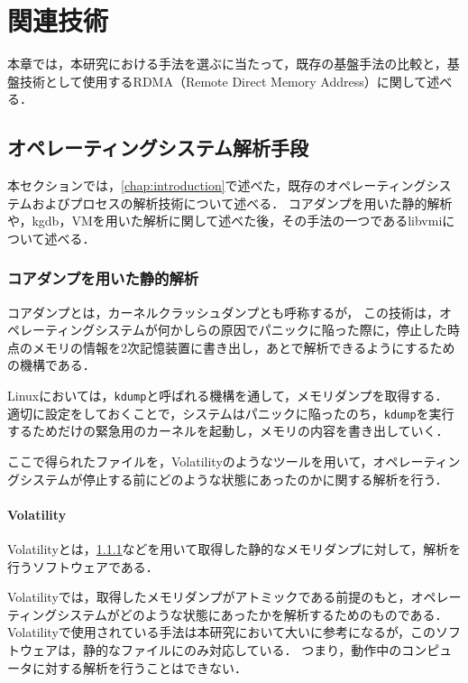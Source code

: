 \chapter{関連技術}
\label{chap:related_works}

本章では，本研究における手法を選ぶに当たって，既存の基盤手法の比較と，基盤技術として使用するRDMA（Remote Direct Memory Address）に関して述べる．

\section{オペレーティングシステム解析手段}

本セクションでは，\ref{chap:introduction}で述べた，既存のオペレーティングシステムおよびプロセスの解析技術について述べる．
コアダンプを用いた静的解析や，kgdb，VMを用いた解析に関して述べた後，その手法の一つであるlibvmiについて述べる．

\subsection{コアダンプを用いた静的解析}
\label{subsubsection:core_dump}

コアダンプとは，カーネルクラッシュダンプとも呼称する\cite{dump}が，
この技術は，オペレーティングシステムが何かしらの原因でパニックに陥った際に，停止した時点のメモリの情報を2次記憶装置に書き出し，あとで解析できるようにするための機構である．

Linuxにおいては，\verb|kdump|と呼ばれる機構を通して，メモリダンプを取得する．
適切に設定をしておくことで，システムはパニックに陥ったのち，\verb|kdump|を実行するためだけの緊急用のカーネルを起動し，メモリの内容を書き出していく．

ここで得られたファイルを，Volatility\cite{Volatility}のようなツールを用いて，オペレーティングシステムが停止する前にどのような状態にあったのかに関する解析を行う．

\subsubsection{Volatility}
\label{subsubsection:Volatility}

Volatility\cite{Volatility}とは，\ref{subsubsection:core_dump}などを用いて取得した静的なメモリダンプに対して，解析を行うソフトウェアである．

Volatilityでは，取得したメモリダンプがアトミックである前提のもと，オペレーティングシステムがどのような状態にあったかを解析するためのものである．
Volatilityで使用されている手法は本研究において大いに参考になるが，このソフトウェアは，静的なファイルにのみ対応している．
つまり，動作中のコンピュータに対する解析を行うことはできない．

